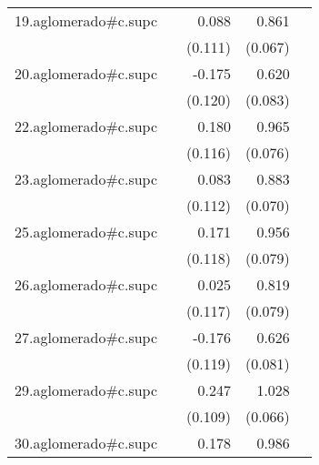 {\begin{longtable}{l*{4}{D{.}{.}{-1}}}
\addlinespace
19.aglomerado#c.supc&                     &       0.088         &       0.861\sym{***}&                     \\
            &                     &     (0.111)         &     (0.067)         &                     \\
\addlinespace
20.aglomerado#c.supc&                     &      -0.175         &       0.620\sym{***}&                     \\
            &                     &     (0.120)         &     (0.083)         &                     \\
\addlinespace
22.aglomerado#c.supc&                     &       0.180         &       0.965\sym{***}&                     \\
            &                     &     (0.116)         &     (0.076)         &                     \\
\addlinespace
23.aglomerado#c.supc&                     &       0.083         &       0.883\sym{***}&                     \\
            &                     &     (0.112)         &     (0.070)         &                     \\
\addlinespace
25.aglomerado#c.supc&                     &       0.171         &       0.956\sym{***}&                     \\
            &                     &     (0.118)         &     (0.079)         &                     \\
\addlinespace
26.aglomerado#c.supc&                     &       0.025         &       0.819\sym{***}&                     \\
            &                     &     (0.117)         &     (0.079)         &                     \\
\addlinespace
27.aglomerado#c.supc&                     &      -0.176         &       0.626\sym{***}&                     \\
            &                     &     (0.119)         &     (0.081)         &                     \\
\addlinespace
29.aglomerado#c.supc&                     &       0.247\sym{*}  &       1.028\sym{***}&                     \\
            &                     &     (0.109)         &     (0.066)         &                     \\
\addlinespace
30.aglomerado#c.supc&                     &       0.178         &       0.986\sym{***}&                     \\

\end{longtable}}
